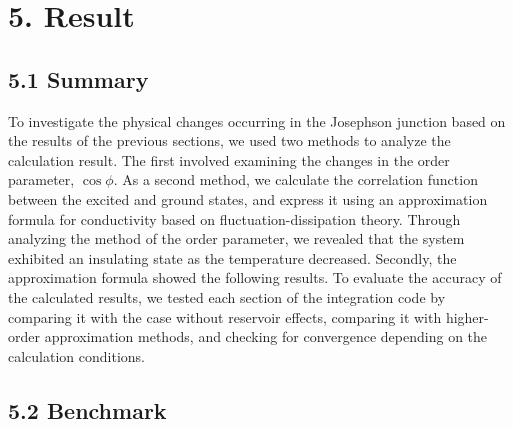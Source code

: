 \documentclass{article}[12pt]
\begin{document}
\section*{5. Result}
\begin{spacing}{1.5}
\subsection*{5.1 Summary}
  To investigate the physical changes occurring in the Josephson junction based on the results of the previous sections, 
  we used two methods to analyze the calculation result. The first involved examining the changes in the order parameter, $\cos{\phi}$. 
  As a second method, we calculate the correlation function between the excited and ground states, 
  and express it using an approximation formula for conductivity based on fluctuation-dissipation theory. 
  Through analyzing the method of the order parameter, we revealed that the system exhibited an insulating state as the temperature decreased. 
  Secondly, the approximation formula showed the following results. To evaluate the accuracy of the calculated results, 
  we tested each section of the integration code by comparing it with the case without reservoir effects, 
  comparing it with higher-order approximation methods, and checking for convergence depending on the calculation conditions.
\subsection*{5.2 Benchmark}

\end{spacing}
\end{document}
